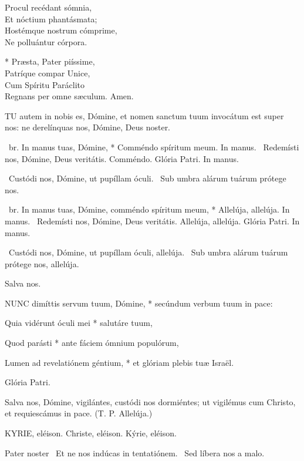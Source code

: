 Procul recédant sómnia,\\
Et nóctium phantásmata;\\
Hostémque nostrum cómprime,\\
Ne polluántur córpora.

* Præsta, Pater piíssime,\\
Patríque compar Unice,\\
Cum Spíritu Paráclito\\
Regnans per omne sæculum. Amen.


\lettrine[lines=2]{T}{U} autem in nobis es, Dómine, et nomen sanctum tuum invocátum est super nos: ne derelínquas nos, Dómine, Deus noster.

\R\ br. In manus tuas, Dómine, * Comméndo spíritum meum. In manus. \V\ Redemísti nos, Dómine, Deus veritátis. Comméndo. Glória Patri. In manus.

\V\ Custódi nos, Dómine, ut pupíllam óculi. \R\ Sub umbra alárum tuárum prótege nos.


\R\ br. In manus tuas, Dómine, comméndo spíritum meum, * Allelúja, allelúja. In manus. \V\ Redemísti nos, Dómine, Deus veritátis. Allelúja, allelúja. Glória Patri. In manus.

\V\ Custódi nos, Dómine, ut pupíllam óculi, allelúja. \R\ Sub umbra alárum tuárum prótege nos, allelúja.

 Salva nos.


\lettrine[lines=2]{N}{UNC} dimíttis servum tuum, Dómine, * secúndum verbum tuum in pace:

Quia vidérunt óculi mei * salutáre tuum,

Quod parásti * ante fáciem ómnium populórum,

Lumen ad revelatiónem géntium, * et glóriam plebis tuæ Israël.

Glória Patri.

 Salva nos, Dómine, vigilántes, custódi nos dormiéntes; ut vigilémus cum Christo, et requiescámus in pace. (T. P. Allelúja.)

\sectionornament


KYRIE, eléison. Christe, eléison. Kýrie, eléison.

Pater noster  \V\ Et ne nos indúcas in tentatiónem. \R\ Sed líbera nos a malo.

